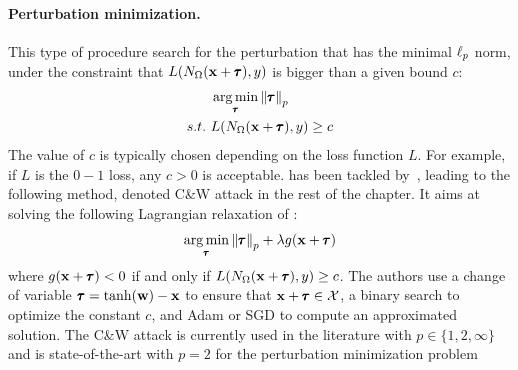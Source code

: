 \paragraph{Perturbation minimization.}
This type of procedure search for the perturbation that has the minimal $\ell_p $ norm, under the constraint that $L(N_\Omega(\mathbf{x} + \pmb{\tau}), y)$ is bigger than a given bound $c$:
\begin{align}
  &\operatorname*{arg\,min}_{\pmb{\tau}} \norm{\pmb{\tau}}_p \label{equation:ch2-normmin} \\
  s.t.\ &L(N_\Omega(\mathbf{x} + \pmb{\tau}), y) \geq c \notag
\end{align}
The value of $c$ is typically chosen depending on the loss function $L$. For example, if $L$ is the $0-1$ loss, any $c > 0$ is acceptable.
 has been tackled by~\citet{carlini2017towards}, leading to the following method, denoted C\&W attack in the rest of the chapter. It aims at solving the following Lagrangian relaxation of :
\begin{equation}
  \operatorname*{arg\,min}_{\pmb{\tau}} \norm{\pmb{\tau}}_p + \lambda g(\mathbf{x}+\pmb{\tau})
\end{equation}
where $g(\mathbf{x} + \pmb{\tau})<0$ if and only if $L(N_\Omega(\mathbf{x} + \pmb{\tau}),y) \geq c$. 
The authors use a change of variable $\pmb{\tau} = \tanh(\mathbf{w}) - \mathbf{x}$ to ensure that $\mathbf{x} + \pmb{\tau} \in \mathcal{X}$, a binary search to optimize the constant $c$, and Adam or SGD to compute an approximated solution.
The C\&W attack is currently used in the literature with $p \in \{1, 2, \infty \}$ and is state-of-the-art with $p=2$ for the perturbation minimization problem





